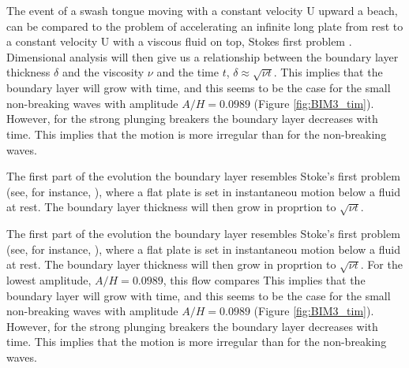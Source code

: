 The event of a swash tongue moving with a constant velocity U upward a beach, can be compared to the problem of accelerating an infinite long plate from rest to a constant velocity U with a viscous fluid on top, Stokes first problem \citep{white2006viscous}. Dimensional analysis will then give us a relationship between the boundary layer thickness $\delta $ and the viscosity $\nu$ and the time $t$,  $\delta \approx \sqrt{\nu t}$.  This implies that the boundary layer will grow with time, and this seems to be the case for the small non-breaking waves with amplitude  $A/H=0.0989$ (Figure \ref{fig:BIM3_tim}). However, for the strong plunging breakers the boundary layer decreases with time. This implies that the motion is more  irregular than for the non-breaking waves. 


The first part of the evolution the boundary layer
resembles Stoke's first problem (see, for instance, 
\citep{white2006viscous}), where a flat plate is set in instantaneou motion below a fluid at rest. The boundary layer thickness will then
grow in proprtion to  $ \sqrt{\nu t}$. 

The first part of the evolution the boundary layer
resembles Stoke's first problem (see, for instance, 
\citep{white2006viscous}), where a flat plate is set in instantaneou motion below a fluid at rest. The boundary layer thickness will then
grow in proprtion to  $ \sqrt{\nu t}$. 
   For the lowest amplitude, $A/H=0.0989$, this flow
compares This implies that the boundary layer will grow with time, and this seems to be the case for the small non-breaking waves with amplitude  $A/H=0.0989$ (Figure \ref{fig:BIM3_tim}). However, for the strong plunging breakers the boundary layer decreases with time. This implies that the motion is more  irregular than for the non-breaking waves. 

